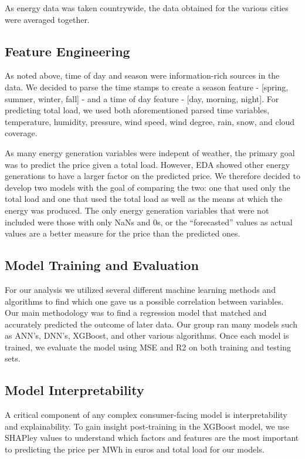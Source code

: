 \documentclass[10pt]{article}
\begin{document}
As energy data was taken countrywide, the data obtained for the various cities were averaged together. 

\subsection{Feature Engineering}
As noted above, time of day and season were information-rich sources in the data. We decided to parse the time stamps to create a season feature - [spring, summer, winter, fall] - and a time of day feature - [day, morning, night]. For predicting total load, we used both aforementioned parsed time variables, temperature, humidity, pressure, wind speed, wind degree, rain, snow, and cloud coverage. 

As many energy generation variables were indepent of weather, the primary goal was to predict the price given a total load. However, EDA showed other energy generations to have a larger factor on the predicted price. We therefore decided to develop two models with the goal of comparing the two: one that used only the total load and one that used the total load as well as the means at which the energy was produced. The only energy generation variables that were not included were those with only NaNs and 0s, or the “forecasted” values as actual values are a better measure for the price than the predicted ones.

\subsection{Model Training and Evaluation}
For our analysis we utilized several different machine learning methods and algorithms to find which one gave us a possible correlation between variables. Our main methodology was to find a regression model that matched and accurately predicted the outcome of later data. Our group ran many models such as ANN’s, DNN’s, XGBoost, and other various algorithms. Once each model is trained, we evaluate the model using MSE and R2 on both training and testing sets.

\subsection{Model Interpretability}
A critical component of any complex consumer-facing model is interpretability and explainability. To gain insight post-training in the XGBoost model, we use SHAPley values to understand which factors and features are the most important to predicting the price per MWh in euros and total load for our models.
\end{document}
